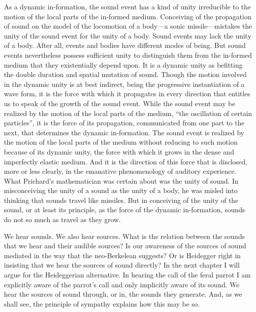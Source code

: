 As a dynamic in-formation, the sound event has a kind of unity irreducible to the motion of the local parts of the in-formed medium. Conceiving of the propagation of sound on the model of the locomotion of a body---a sonic missile---mistakes the unity of the sound event for the unity of a body. Sound events may lack the unity of a body. After all, events and bodies have different modes of being. But sound events nevertheless possess sufficient unity to distinguish them from the in-formed medium that they existentially depend upon. It is a dynamic unity as befitting the double duration and spatial mutation of sound. Though the motion involved in the dynamic unity is at best indirect, being the progressive instantiation of a wave form, it is the force with which it propagates in every direction that entitles us to speak of the growth of the sound event.  While the sound event may be realized by the motion of the local parts of the medium, ``the oscillation of certain particles'', it is the force of its propagation, communicated from one part to the next, that determines the dynamic in-formation. The sound event is realized by the motion of the local parts of the medium without reducing to such motion because of its dynamic unity, the force with which it grows in the dense and imperfectly elastic medium. And it is the direction of this force that is disclosed, more or less clearly, in the emanative phenomenology of auditory experience. What Prichard's mathematician was certain about was the unity of sound. In misconceiving the unity of a sound as the unity of a body, he was misled into thinking that sounds travel like missiles. But in conceiving of the unity of the sound, or at least its principle, as the force of the dynamic in-formation, sounds do not so much as travel as they grow.

We hear sounds. We also hear sources. What is the relation between the sounds that we hear and their audible sources? Is our awareness of the sources of sound mediated in the way that the neo-Berkelean suggests? Or is Heidegger right in insisting that we hear the sources of sound directly? In the next chapter I will argue for the Heideggerian alternative. In hearing the call of the feral parrot I am explicitly aware of the parrot's call and only implicitly aware of its sound. We hear the sources of sound through, or in, the sounds they generate. And, as we shall see, the principle of sympathy explains how this may be so.



